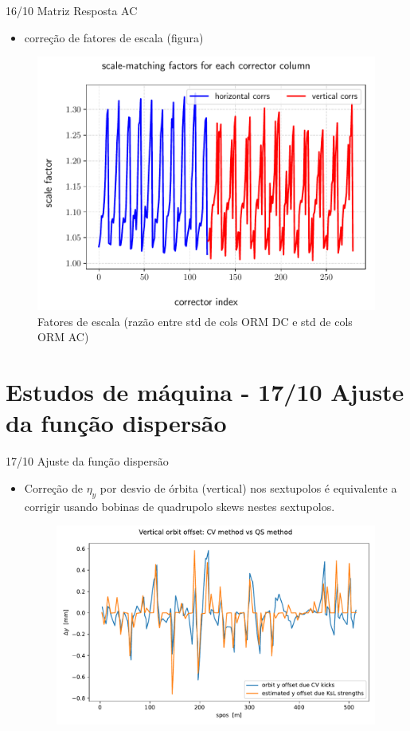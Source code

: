 \documentclass{beamer}					  %
\begin{document}
\begin{frame}{16/10 Matriz Resposta AC}
    \begin{itemize}
        \item correção de fatores de escala (figura)
	\end{itemize}
    \begin{figure}[H]
		\centering
        \includegraphics[width=.7\textwidth]{2023-10-27/figures/scale_factors.pdf}
        \caption*{{\footnotesize Fatores de escala (razão entre std de cols ORM DC e std de cols ORM AC)}}
        \label{fig:figure1}
    \end{figure}
\end{frame}



\section{Estudos de máquina - 17/10 Ajuste da função dispersão}

\begin{frame}{17/10 Ajuste da função dispersão}
    \begin{itemize}
		\item Correção de $\eta_y$ por desvio de órbita (vertical) nos sextupolos é equivalente a corrigir usando bobinas de quadrupolo skews nestes sextupolos.
    \begin{figure}[H]
		\centering
        \includegraphics[width=.7\textwidth]{2023-10-27/figures/Orbit_Y_Offset_QS_versus_CV 1}
        \label{fig:figure1}
    \end{figure}
	\end{itemize}
\end{frame}
\end{document}

